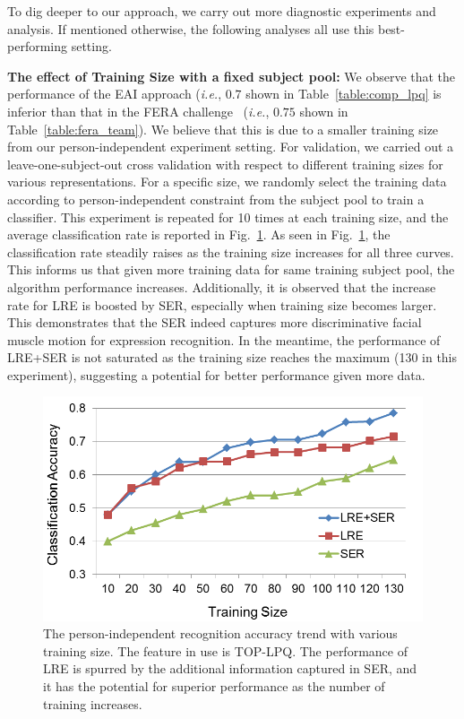 \documentclass[journal]{IEEEtran}
\begin{document}
To dig deeper to our approach, we carry out more diagnostic experiments and analysis. If mentioned otherwise, the following analyses all use this best-performing setting. 

\textbf{The effect of Training Size with a fixed subject pool: } We observe that the performance of the EAI approach (\textit{i.e.}, $0.7$ shown in Table~\ref{table:comp_lpq} is inferior than that in the FERA challenge~\cite{Yang_SMCB12} (\textit{i.e.}, $0.75$ shown in Table~\ref{table:fera_team}). We believe that this is due to a smaller training size from our person-independent experiment setting. For validation, we carried out a leave-one-subject-out cross validation with respect to different training sizes for various representations. For a specific size, we randomly select the training data according to person-independent constraint from the subject pool to train a classifier. This experiment is repeated for 10 times at each training size, and the average classification rate is reported in Fig.~\ref{fig:effect_training_size}. As seen in Fig.~\ref{fig:effect_training_size}, the classification rate steadily raises as the training size increases for all three curves. This informs us that given more training data for same training subject pool, the algorithm performance increases. Additionally, it is observed that the increase rate for LRE is boosted by SER, especially when training size becomes larger. This demonstrates that the SER indeed captures more discriminative facial muscle motion for expression recognition. In the meantime, the performance of LRE+SER is not saturated as the training size reaches the maximum (130 in this experiment), suggesting a potential for better performance given more data.


\begin{figure}[htbp]
	\centering
		\includegraphics[width=.8\columnwidth]{pics/effect_training_size.png}
	\caption{The person-independent recognition accuracy trend with various training size. The feature in use is TOP-LPQ. The performance of LRE is spurred by the additional information captured in SER, and it has the potential for superior performance as the number of training increases.}
	\label{fig:effect_training_size}
\end{figure}
\end{document}
